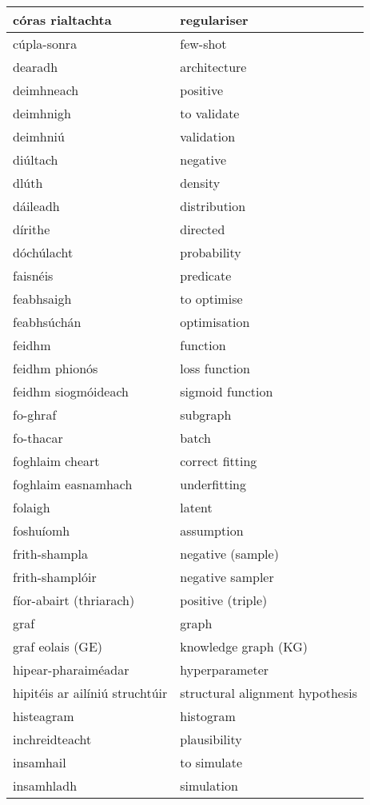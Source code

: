 \documentclass{article}
\begin{document}
\begin{longtable}{|l|l|}
		córas rialtachta&regulariser\\ \hline 
		cúpla-sonra&few-shot\\ \hline 
		dearadh&architecture\\ \hline 
		deimhneach&positive\\ \hline 
		deimhnigh&to validate\\ \hline 
		deimhniú&validation\\ \hline 
		diúltach&negative\\ \hline 
		dlúth&density\\ \hline 
		dáileadh&distribution\\ \hline 
		dírithe&directed\\ \hline 
		dóchúlacht&probability\\ \hline 
		faisnéis&predicate\\ \hline 
		feabhsaigh&to optimise\\ \hline 
		feabhsúchán&optimisation\\ \hline 
		feidhm&function\\ \hline 
		feidhm phionós&loss function\\ \hline 
		feidhm siogmóideach&sigmoid function\\ \hline 
		fo-ghraf&subgraph\\ \hline 
		fo-thacar&batch\\ \hline 
		foghlaim cheart&correct fitting\\ \hline 
		foghlaim easnamhach&underfitting\\ \hline 
		folaigh&latent\\ \hline 
		foshuíomh&assumption\\ \hline 
		frith-shampla&negative (sample)\\ \hline 
		frith-shamplóir&negative sampler\\ \hline 
		fíor-abairt (thriarach)&positive (triple)\\ \hline 
		graf&graph\\ \hline 
		graf eolais (GE)&knowledge graph (KG)\\ \hline 
		hipear-pharaiméadar&hyperparameter\\ \hline 
		hipitéis ar ailíniú struchtúir&structural alignment hypothesis\\ \hline 
		histeagram&histogram\\ \hline 
		inchreidteacht&plausibility\\ \hline 
		insamhail&to simulate\\ \hline 
		insamhladh&simulation\\ \hline 

\end{longtable}
\end{document}
